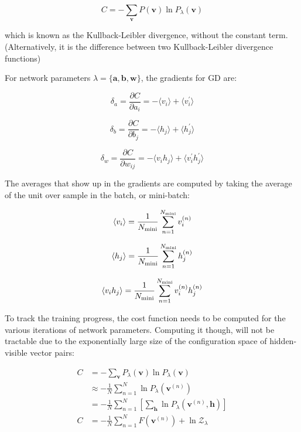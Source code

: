 \documentclass[12pt, two sided]{article}
\begin{document}
\begin{equation}
C = -\sum_{\mathbf{v}} P(\mathbf{v}) \ln P_{\lambda}(\mathbf{v})
\end{equation}

which is known as the Kullback-Leibler divergence, without the constant term. (Alternatively, it is the difference between two Kullback-Leibler divergence functions)

For network parameters $\lambda = \lbrace \mathbf{a}, \mathbf{b}, \mathbf{w} \rbrace$, the gradients for GD are:

\begin{equation}
\delta_a = \frac{\partial C}{\partial a_i} = -\langle v_i \rangle + \langle v_i^{\prime}\rangle
\end{equation}

\begin{equation}
\delta_b = \frac{\partial C}{\partial b_j} = -\langle h_j \rangle + \langle h_j^{\prime}\rangle
\end{equation}

\begin{equation}
\delta_w = \frac{\partial C}{\partial w_{ij}} = -\langle v_i h_j \rangle + \langle v_i^{\prime} h_j^{\prime}\rangle
\end{equation}

The averages that show up in the gradients are computed by taking the average of the unit over sample in the batch, or mini-batch:

\begin{equation}
\langle v_i \rangle = \frac{1}{N_{\rm{mini}}} \sum_{n=1}^{N_{\rm{mini}}} v_i^{(n)}
\end{equation}

\begin{equation}
\langle h_j \rangle = \frac{1}{N_{\rm{mini}}} \sum_{n=1}^{N_{\rm{mini}}} h_j^{(n)}
\end{equation}

\begin{equation}
\langle v_i h_j \rangle = \frac{1}{N_{\rm{mini}}} \sum_{n=1}^{N_{\rm{mini}}} v_i^{(n)} h_j^{(n)}
\end{equation}

To track the training progress, the cost function needs to be computed for the various iterations of network parameters. Computing it though, will not be tractable due to the exponentially large size of the configuration space of hidden-visible vector pairs:

\begin{align}
C &= -\sum_{\mathbf{v}} P_{\lambda}(\mathbf{v}) \ln P_{\lambda}(\mathbf{v}) \\
&\approx -\frac{1}{N} \sum_{n=1}^{N} \ln P_{\lambda}(\mathbf{v}^{(n)}) \\
&= -\frac{1}{N} \sum_{n=1}^{N} [\sum_{\mathbf{h}} \ln P_{\lambda}(\mathbf{v}^{(n)},\mathbf{h})] \\
C &= -\frac{1}{N} \sum_{n=1}^{N} F(\mathbf{v}^{(n)}) + \ln \mathcal{Z}_{\lambda}
\end{align}
\end{document}

